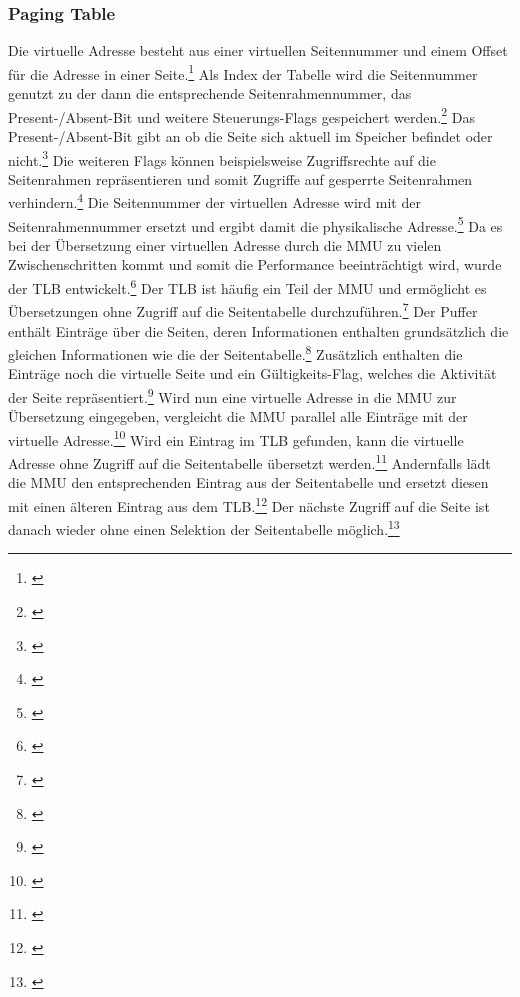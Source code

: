 \subsubsection{Paging Table}
Die virtuelle Adresse besteht aus einer virtuellen Seitennummer und einem Offset für die Adresse in einer Seite.\footnote{\cite[S.~257]{Tanenbaum.2016}} Als Index der Tabelle wird die Seitennummer genutzt zu der dann die entsprechende Seitenrahmennummer, das Present-/Absent-Bit und weitere Steuerungs-Flags gespeichert werden.\footnote{\cite[S.~257]{Tanenbaum.2016}} Das Present-/Absent-Bit gibt an ob die Seite sich aktuell im Speicher befindet oder nicht.\footnote{\cite[S.~255]{Tanenbaum.2016}} Die weiteren Flags können beispielsweise Zugriffsrechte auf die Seitenrahmen repräsentieren und somit Zugriffe auf gesperrte Seitenrahmen verhindern.\footnote{\cite[S.~258]{Tanenbaum.2016}} Die Seitennummer der virtuellen Adresse wird mit der Seitenrahmennummer ersetzt und ergibt damit die physikalische Adresse.\footnote{\cite[S.~257]{Tanenbaum.2016}}
Da es bei der Übersetzung einer virtuellen Adresse durch die \ac{MMU} zu vielen Zwischenschritten kommt und somit die Performance beeinträchtigt wird, wurde der \ac{TLB} entwickelt.\footnote{\cite[S.~260--261]{Tanenbaum.2016}} Der \ac{TLB} ist häufig ein Teil der \ac{MMU} und ermöglicht es Übersetzungen ohne Zugriff auf die Seitentabelle durchzuführen.\footnote{\cite[S.~260--261]{Tanenbaum.2016}} Der Puffer enthält Einträge über die Seiten, deren Informationen enthalten grundsätzlich die gleichen Informationen wie die der Seitentabelle.\footnote{\cite[S.~260--261]{Tanenbaum.2016}} Zusätzlich enthalten die Einträge noch die virtuelle Seite und ein Gültigkeits-Flag, welches die Aktivität der Seite repräsentiert.\footnote{\cite[S.~260--261]{Tanenbaum.2016}} Wird nun eine virtuelle Adresse in die \ac{MMU} zur Übersetzung eingegeben, vergleicht die \ac{MMU} parallel alle Einträge mit der virtuelle Adresse.\footnote{\cite[S.~260--261]{Tanenbaum.2016}} Wird ein Eintrag im \ac{TLB} gefunden, kann die virtuelle Adresse ohne Zugriff auf die Seitentabelle übersetzt werden.\footnote{\cite[S.~260--261]{Tanenbaum.2016}} Andernfalls lädt die \ac{MMU} den entsprechenden Eintrag aus der Seitentabelle und ersetzt diesen mit einen älteren Eintrag aus dem \ac{TLB}.\footnote{\cite[S.~260--261]{Tanenbaum.2016}} Der nächste Zugriff auf die Seite ist danach wieder ohne einen Selektion der Seitentabelle möglich.\footnote{\cite[S.~260--261]{Tanenbaum.2016}}

